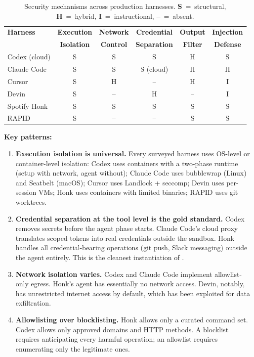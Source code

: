 \documentclass[11pt, a4paper, copyright]{googledeepmind}
\begin{document}
\begin{table}[h]
\centering
\caption{Security mechanisms across production harnesses. \textbf{S}~=~structural, \textbf{H}~=~hybrid, \textbf{I}~=~instructional, \textbf{--}~=~absent.}
\label{tab:harness-survey}
\small
\begin{tabular}{lccccc}
\toprule
\textbf{Harness} & \textbf{Execution} & \textbf{Network} & \textbf{Credential} & \textbf{Output} & \textbf{Injection} \\
 & \textbf{Isolation} & \textbf{Control} & \textbf{Separation} & \textbf{Filter} & \textbf{Defense} \\
\midrule
Codex (cloud) & S & S & S & H & S \\
Claude Code & S & S & S (cloud) & H & H \\
Cursor & S & H & -- & H & I \\
Devin & S & -- & H & -- & I \\
Spotify Honk & S & S & S & S & S \\
RAPID & S & -- & -- & S & S \\
\bottomrule
\end{tabular}
\end{table}

\textbf{Key patterns:}

\begin{enumerate}
    \item \textbf{Execution isolation is universal.} Every surveyed harness uses OS-level or container-level isolation: Codex uses containers with a two-phase runtime (setup with network, agent without); Claude Code uses bubblewrap (Linux) and Seatbelt (macOS); Cursor uses Landlock + seccomp; Devin uses per-session VMs; Honk uses containers with limited binaries; RAPID uses git worktrees.

    \item \textbf{Credential separation at the tool level is the gold standard.} Codex removes secrets before the agent phase starts. Claude Code's cloud proxy translates scoped tokens into real credentials outside the sandbox. Honk handles all credential-bearing operations (git push, Slack messaging) outside the agent entirely. This is the cleanest instantiation of .

    \item \textbf{Network isolation varies.} Codex and Claude Code implement allowlist-only egress. Honk's agent has essentially no network access. Devin, notably, has unrestricted internet access by default, which has been exploited for data exfiltration.

    \item \textbf{Allowlisting over blocklisting.} Honk allows only a curated command set. Codex allows only approved domains and HTTP methods. A blocklist requires anticipating every harmful operation; an allowlist requires enumerating only the legitimate ones.
\end{enumerate}
\end{document}
